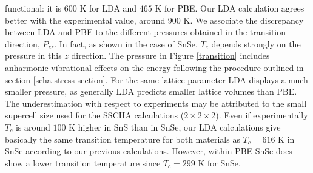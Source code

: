 functional: it is $600$ K for LDA and $465$ K for PBE. Our LDA calculation agrees better with the experimental value, around $900$ K\cite{chattopadhyay1986neutron}. We associate the discrepancy between LDA and PBE  to the different
pressures obtained in the transition direction, $P_{zz}$. In fact, as shown in the case of SnSe\cite{aseginolaza2019phonon}, $T_{c}$ depends strongly on the pressure in this $z$ direction. The pressure in
Figure \ref{transition} includes anharmonic vibrational effects on the energy following the procedure outlined in section \ref{scha-stress-section}. For the same lattice parameter LDA displays a much smaller pressure, as
generally LDA predicts smaller lattice volumes than PBE. The underestimation with respect to experiments may be attributed to the small supercell size used for the SSCHA calculations ($2\times2\times2$). Even if
experimentally $T_{c}$ is around $100$ K higher in SnS than in SnSe, our LDA calculations give basically the same transition temperature for both materials as $T_{c}=616$ K in SnSe according to our previous
calculations\cite{aseginolaza2019phonon}. However, within PBE SnSe does show a lower transition temperature since $T_c=299$ K for SnSe\cite{aseginolaza2019phonon}.
